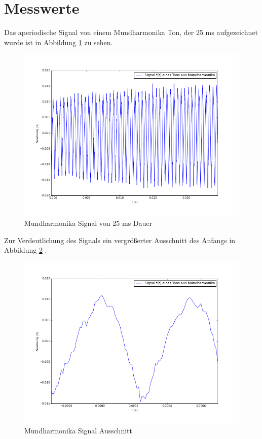 \documentclass[12pt,oneside,a4paper]{report}
\begin{document}
\section{Messwerte}
\label{chap:VERSUCH_1_MESSWERTE}

Das aperiodische Signal von einem Mundharmonika Ton, der 25 ms aufgezeichnet wurde ist in Abbildung \ref{fig:SignalKomplet} zu sehen.

\begin{figure}[H]
	\centering\small
	\includegraphics[width=\textwidth]{src/V1_Signal_komplet.png}
	\caption{Mundharmonika Signal von 25 ms Dauer}
	\label{fig:SignalKomplet}
\end{figure}

Zur Verdeutlichung des Signals ein vergrößerter Ausschnitt des Anfangs in Abbildung \ref{fig:SignalAusschnitt} .

\begin{figure}[H]
	\centering\small
	\includegraphics[width=\textwidth]{src/V1_Signal_grundfrequenz.png}
	\caption{Mundharmonika Signal Ausschnitt}
	\label{fig:SignalAusschnitt}
\end{figure}
\end{document}
